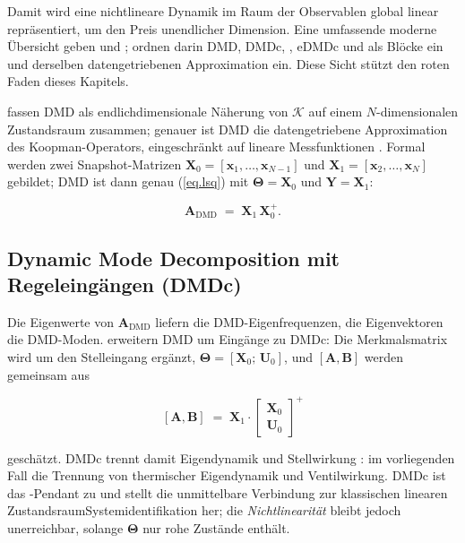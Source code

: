 Damit wird eine nichtlineare Dynamik im Raum der Observablen global
linear repräsentiert, um den Preis unendlicher Dimension. Eine
umfassende moderne Übersicht geben
\cite{bruntonModernKoopmanTheory2022} und
\cite{mauroyKoopmanOperatorSystems2020};
\cite{bruntonModernKoopmanTheory2022} ordnen darin DMD, DMDc, \edmd,
eDMDc und \sindyc{} als Blöcke ein und derselben datengetriebenen
Approximation ein. Diese Sicht stützt den roten Faden dieses
Kapitels.

\cite{kutzDynamicModeDecomposition2016} fassen DMD als
endlichdimensionale Näherung von $\mathcal K$ auf einem
$N$-dimensionalen Zustandsraum zusammen; genauer ist DMD die
datengetriebene Approximation des Koopman-Operators, eingeschränkt auf
lineare Messfunktionen \cite{bruntonModernKoopmanTheory2022}. Formal
werden zwei Snapshot-Matrizen
$\mathbf X_0 = [\mathbf x_1, \dots, \mathbf x_{N-1}]$ und
$\mathbf X_1 = [\mathbf x_2, \dots, \mathbf x_N]$ gebildet; DMD ist dann
genau (\ref{eq.lsq}) mit $\boldsymbol\Theta = \mathbf X_0$ und
$\mathbf Y = \mathbf X_1$:

\begin{equation}
  \label{eq.dmd}
  \mathbf A_{\text{DMD}} \;=\; \mathbf X_1\,\mathbf X_0^+.
\end{equation}



\subsection{Dynamic Mode Decomposition mit Regeleingängen (DMDc)}

Die Eigenwerte von $\mathbf A_{\text{DMD}}$ liefern die
DMD-Eigenfrequenzen, die Eigenvektoren die DMD-Moden.
\cite{proctorDynamicModeDecomposition2016} erweitern DMD um Eingänge zu
DMDc: Die Merkmalsmatrix wird um den Stelleingang ergänzt,
$\boldsymbol\Theta = [\mathbf X_0;\,\mathbf U_0]$, und
$[\mathbf A, \mathbf B]$ werden gemeinsam aus

\begin{equation}
  \label{eq.dmdc}
  [\mathbf A, \mathbf B]
  \;=\;
  \mathbf X_1 \cdot \begin{bmatrix}\mathbf X_0\\ \mathbf U_0\end{bmatrix}^{+}
\end{equation}

geschätzt. DMDc trennt damit Eigendynamik und Stellwirkung
\cite{bruntonModernKoopmanTheory2022}: im vorliegenden Fall die
Trennung von thermischer Eigendynamik und Ventilwirkung. DMDc ist das
\edmd-Pendant zu \sindyc{} und stellt die unmittelbare Verbindung zur
klassischen linearen Zustandsraum\-Systemidentifikation her; die
\emph{Nichtlinearität} bleibt jedoch unerreichbar, solange
$\boldsymbol\Theta$ nur rohe Zustände enthält.


